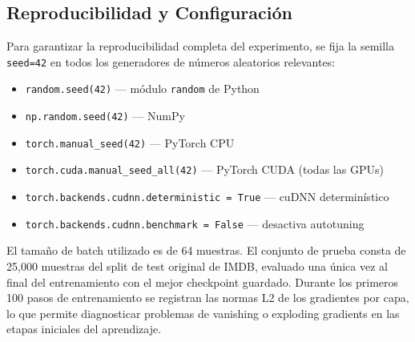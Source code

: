 \subsection{Reproducibilidad y Configuración}

Para garantizar la reproducibilidad completa del experimento, se fija la semilla
\texttt{seed=42} en todos los generadores de números aleatorios relevantes:
\begin{itemize}
    \item \texttt{random.seed(42)} — módulo \texttt{random} de Python
    \item \texttt{np.random.seed(42)} — NumPy
    \item \texttt{torch.manual\_seed(42)} — PyTorch CPU
    \item \texttt{torch.cuda.manual\_seed\_all(42)} — PyTorch CUDA (todas las GPUs)
    \item \texttt{torch.backends.cudnn.deterministic = True} — cuDNN determinístico
    \item \texttt{torch.backends.cudnn.benchmark = False} — desactiva autotuning
\end{itemize}

El tamaño de batch utilizado es de 64 muestras. El conjunto de prueba consta de 25,000
muestras del split de test original de IMDB, evaluado una única vez al final del
entrenamiento con el mejor checkpoint guardado. Durante los primeros 100 pasos de
entrenamiento se registran las normas L2 de los gradientes por capa, lo que permite
diagnosticar problemas de vanishing o exploding gradients en las etapas iniciales del
aprendizaje.
